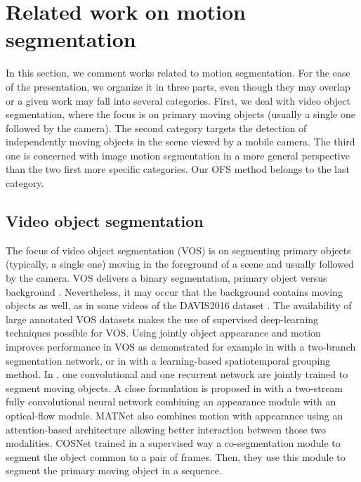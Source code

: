 \documentclass[10pt,twocolumn,letterpaper]{article}
\begin{document}
\section{Related work on motion segmentation}
\label{related-work}

In this section, we comment works related to motion segmentation. For the ease of the presentation, we organize it in three parts, even though they may overlap or a given work may fall into several categories. First, we deal with video object segmentation, where the focus is on primary moving objects (usually a single one followed by the camera). The second category targets the detection of independently moving objects in the scene viewed by a mobile camera. The third one is concerned with image motion segmentation in a more general perspective {\color{black} than the two first more specific categories. Our OFS method belongs to the last category.}


\subsection{Video object segmentation}


The focus of video object segmentation (VOS) is on segmenting primary objects (typically, a single one) moving in the foreground of a scene and usually followed by the camera. VOS delivers a binary segmentation, primary object versus background \cite{wang_survey-VOS}. Nevertheless, it may occur that the background contains moving objects as well, as in some videos of the DAVIS2016 dataset \cite{pont-tuset_benchmark_2016}. The availability of large annotated VOS datasets makes the use of supervised deep-learning techniques possible for VOS. Using jointly object appearance and motion improves performance in VOS as demonstrated for example in \cite{cheng2017} with a two-branch segmentation network, or in \cite{dave2019} with a learning-based spatiotemporal grouping method. In \cite{song_pyramid_2018}, one convolutional and one recurrent network are jointly trained to segment moving objects. A close formulation is proposed in \cite{jain_fusionseg_2017} with a two-stream fully convolutional neural network combining an appearance module with an optical-flow module. MATNet \cite{matnet} also combines motion with appearance using an attention-based architecture allowing better interaction between those two modalities. COSNet \cite{cosnet} trained in a supervised way a co-segmentation module to segment the object common to a pair of frames. Then, they use this module to segment the primary moving object in a sequence.
\end{document}
